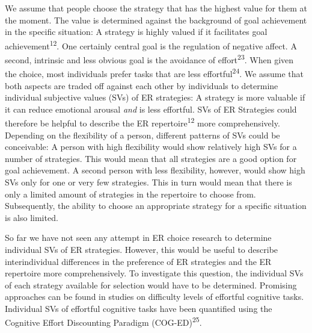 \documentclass[
  english,
  man,floatsintext]{apa6}
\begin{document}
We assume that people choose the strategy that has the highest value for them at the moment.
The value is determined against the background of goal achievement in the specific situation: A strategy is highly valued if it facilitates goal achievement\textsuperscript{12}.
One certainly central goal is the regulation of negative affect.
A second, intrinsic and less obvious goal is the avoidance of effort\textsuperscript{23}.
When given the choice, most individuals prefer tasks that are less effortful\textsuperscript{24}.
We assume that both aspects are traded off against each other by individuals to determine individual subjective values (SVs) of ER strategies: A strategy is more valuable if it can reduce emotional arousal \emph{and} is less effortful.
SVs of ER Strategies could therefore be helpful to describe the ER repertoire\textsuperscript{12} more comprehensively.
Depending on the flexibility of a person, different patterns of SVs could be conceivable: A person with high flexibility would show relatively high SVs for a number of strategies.
This would mean that all strategies are a good option for goal achievement.
A second person with less flexibility, however, would show high SVs only for one or very few strategies.
This in turn would mean that there is only a limited amount of strategies in the repertoire to choose from.
Subsequently, the ability to choose an appropriate strategy for a specific situation is also limited.

So far we have not seen any attempt in ER choice research to determine individual SVs of ER strategies.
However, this would be useful to describe interindividual differences in the preference of ER strategies and the ER repertoire more comprehensively.
To investigate this question, the individual SVs of each strategy available for selection would have to be determined.
Promising approaches can be found in studies on difficulty levels of effortful cognitive tasks.\\
Individual SVs of effortful cognitive tasks have been quantified using the Cognitive Effort Discounting Paradigm (COG-ED)\textsuperscript{25}.
\end{document}

